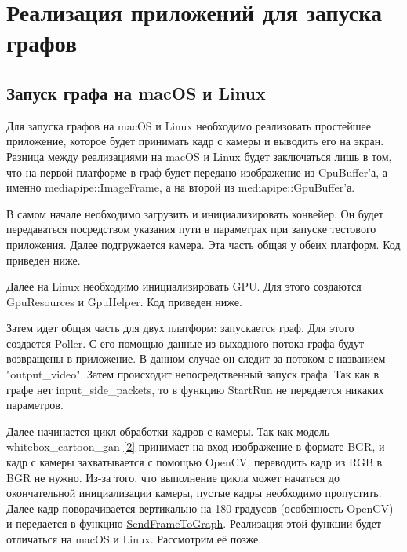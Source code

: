 \documentclass[a4paper,14pt]{extreport}
\begin{document}
    \chapter{Реализация приложений для запуска графов}
        \section{Запуск графа на macOS и Linux}
        Для запуска графов на macOS и Linux необходимо реализовать простейшее приложение, которое будет принимать кадр с камеры и выводить его на экран. Разница между реализациями на macOS и Linux будет заключаться лишь в том, что на первой платформе в граф будет передано изображение из CpuBuffer'а, а именно mediapipe::ImageFrame, а на второй из mediapipe::GpuBuffer'а.

        В самом начале необходимо загрузить и инициализировать конвейер. Он будет передаваться посредством указания пути в параметрах при запуске тестового приложения. Далее подгружается камера. Эта часть общая у обеих платформ. Код приведен ниже.
        

        Далее на Linux необходимо инициализировать GPU. Для этого создаются GpuResources и GpuHelper. Код приведен ниже.
        

        Затем идет общая часть для двух платформ: запускается граф. Для этого создается \hypertarget{poller}{Poller}. С его помощью данные из выходного потока графа будут возвращены в приложение. В данном случае он следит за потоком с названием "output\_video". Затем происходит непосредственный запуск графа. Так как в графе нет input\_side\_packets, то в функцию StartRun не передается никаких параметров.
        

        Далее начинается цикл обработки кадров с камеры. Так как модель whitebox\_cartoon\_gan \hyperlink{[2]}{[2]} принимает на вход изображение в формате BGR, и кадр с камеры захватывается с помощью OpenCV, переводить кадр из RGB в BGR не нужно. Из-за того, что выполнение цикла может начаться до окончательной инициализации камеры, пустые кадры необходимо пропустить. Далее кадр поворачивается вертикально на 180 градусов (особенность OpenCV) и передается в функцию \hyperlink{send}{SendFrameToGraph}. Реализация этой функции будет отличаться на macOS и Linux. Рассмотрим её позже.
        
\end{document}
